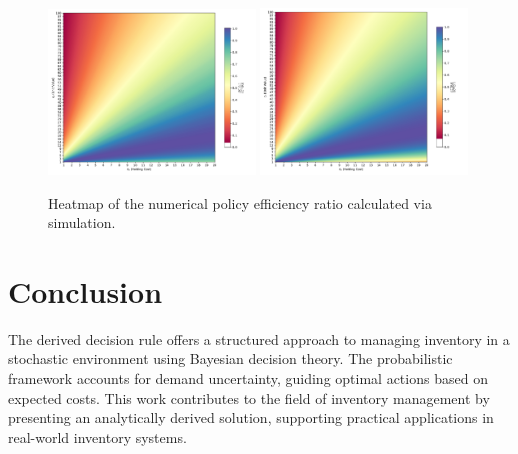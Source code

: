 \documentclass[a4paper,12pt]{article}
\begin{document}
	
	\begin{figure}[h!]
		\centering
		\includegraphics[width=0.49\textwidth]{figures/simulated_per.pdf}
		\includegraphics[width=0.49\textwidth]{figures/simulated_per2.pdf}
		\caption{Heatmap of the numerical policy efficiency ratio calculated via simulation.}
		\label{fig:heatmap_numerical}
	\end{figure}
	


	
	\section{Conclusion}
	The derived decision rule offers a structured approach to managing inventory in a stochastic environment using Bayesian decision theory. The probabilistic framework accounts for demand uncertainty, guiding optimal actions based on expected costs. This work contributes to the field of inventory management by presenting an analytically derived solution, supporting practical applications in real-world inventory systems.
	
\end{document}
